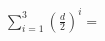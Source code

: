 \documentclass[preview]{standalone}
\begin{document}
\begin{align*}
\sum_{i=1}^3 \left(\frac{d}{2}\right)^i=
\end{align*}
\end{document}
